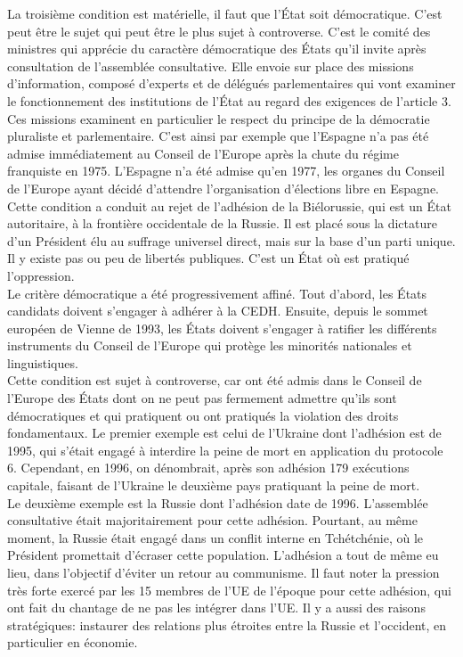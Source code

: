\documentclass[10pt, a4paper, openany]{book}
\begin{document}
La troisième condition est matérielle, il faut que l'État soit démocratique. C'est peut être le sujet qui peut être le plus sujet à controverse. C'est le comité des ministres qui apprécie du caractère démocratique des États qu'il invite après consultation de l'assemblée consultative. Elle envoie sur place des missions d'information, composé d'experts et de délégués parlementaires qui vont examiner le fonctionnement des institutions de l'État au regard des exigences de l'article 3. \\
Ces missions examinent en particulier le respect du principe de la démocratie pluraliste et parlementaire. C'est ainsi par exemple que l'Espagne n'a pas été admise immédiatement au Conseil de l'Europe après la chute du régime franquiste en 1975. L'Espagne n'a été admise qu'en 1977, les organes du Conseil de l'Europe ayant décidé d'attendre l'organisation d'élections libre en Espagne. \\
Cette condition a conduit au rejet de l'adhésion de la Biélorussie, qui est un État autoritaire, à la frontière occidentale de la Russie. Il est placé sous la dictature d'un Président élu au suffrage universel direct, mais sur la base d'un parti unique. Il y existe pas ou peu de libertés publiques. C'est un État où est pratiqué l'oppression. \\
Le critère démocratique a été progressivement affiné. Tout d'abord, les États candidats doivent s'engager à adhérer à la CEDH. Ensuite, depuis le sommet européen de Vienne de 1993, les États doivent s'engager à ratifier les différents instruments du Conseil de l'Europe qui protège les minorités nationales et linguistiques. \\
Cette condition est sujet à controverse, car ont été admis dans le Conseil de l'Europe des États dont on ne peut pas fermement admettre qu'ils sont démocratiques et qui pratiquent ou ont pratiqués la violation des droits fondamentaux. Le premier exemple est celui de l'Ukraine dont l'adhésion est de 1995, qui s'était engagé à interdire la peine de mort en application du protocole 6. Cependant, en 1996, on dénombrait, après son adhésion 179 exécutions capitale, faisant de l'Ukraine le deuxième pays pratiquant la peine de mort. \\
Le deuxième exemple est la Russie dont l'adhésion date de 1996. L'assemblée consultative était majoritairement pour cette adhésion. Pourtant, au même moment, la Russie était engagé dans un conflit interne en Tchétchénie, où le Président promettait d'écraser cette population. L'adhésion a tout de même eu lieu, dans l'objectif d'éviter un retour au communisme. Il faut noter la pression très forte exercé par les 15 membres de l'UE de l'époque pour cette adhésion, qui ont fait du chantage de ne pas les intégrer dans l'UE. Il y a aussi des raisons stratégiques: instaurer des relations plus étroites entre la Russie et l'occident, en particulier en économie. 
\end{document}
